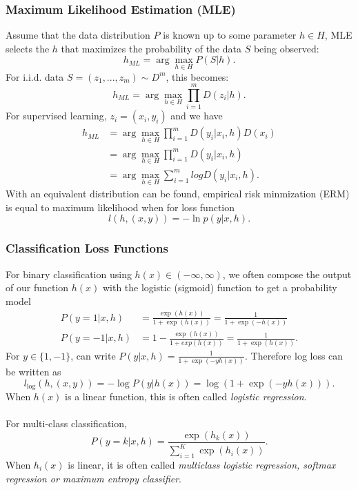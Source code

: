\documentclass{article}
\begin{document}
    \subsubsection{Maximum Likelihood Estimation (MLE)}
    Assume that the data distribution $P$ is known up to some parameter $h \in H$, MLE selects the $h$ that maximizes the probability of the data $S$ being observed:
    \begin{equation}
    h_{ML} = \arg \max_{h\in H} P(S|h).
    \end{equation}
    For i.i.d. data $S = (z_1,...,z_m) \sim D^m$, this becomes:
    \begin{equation}
    h_{ML} = \arg \max_{h \in H} \prod_{i=1}^m D(z_i | h).
    \end{equation}
    For supervised learning, $z_i = (x_i, y_i)$ and we have
    \begin{align}
    h_{ML} &= \arg \max_{h \in H} \prod_{i=1}^m D(y_i | x_i, h) D(x_i) \\
    	   &= \arg \max_{h \in H} \prod_{i=1}^m D(y_i | x_i, h) \\
           &= \arg \max_{h \in H} \sum_{i=1}^m log D(y_i | x_i, h).
    \end{align}
    With an equivalent distribution can be found, empirical risk minmization (ERM) is equal to maximum likelihood when for loss function
    \begin{equation}
    l(h, (x,y)) = -\ln p(y|x,h).
    \end{equation}
    
    \subsubsection{Classification Loss Functions}
    For binary classification using $h(x) \in (-\infty , \infty)$, we often compose the output of our function $h(x)$ with the logistic (sigmoid) function to get a probability model 
    \begin{align}
    P(y=1|x,h) &= \frac{\exp(h(x))}{1 + \exp(h(x))} = \frac{1}{1+\exp(-h(x))} \\
    P(y=-1|x,h) &= 1-\frac{\exp(h(x))}{1 + exp(h(x))} = \frac{1}{1 + \exp(h(x))}.
    \end{align}
    For $y \in \{1,-1\}$, can write $P(y|x,h) = \frac{1}{1+\exp(-yh(x))}.$ Therefore log loss can be written as
    \begin{equation}
    l_{\log}(h,(x,y)) = -\log P(y|h(x)) = \log(1+\exp (-yh(x))).
    \end{equation}
    When $h(x)$ is a linear function, this is often called \textit{logistic regression}. \\\\
    For multi-class classification, 
    \begin{equation}
    P(y=k|x,h)=\frac{\exp(h_k(x))}{\sum_{i=1}^K \exp (h_i(x))}.
    \end{equation}
    When $h_i(x)$ is linear, it is often called \textit{multiclass logistic regression, softmax regression or maximum entropy classifier}.
    
\end{document}
